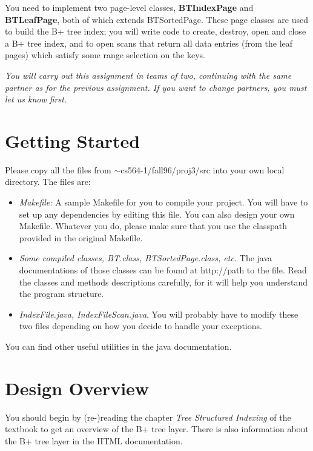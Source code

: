 You need to implement two page-level classes,
{\bf BTIndexPage} and {\bf BTLeafPage}, both of which extends
BTSortedPage.
These page classes are used to build the B+ tree index;
you will write code to create, destroy, open and close a B+ tree index, and
to open scans that return all data entries (from the leaf pages)
which satisfy some range selection on the keys.

{\em  You will carry out this assignment in teams of
two, continuing with the same partner as for the previous assignment.
If you want to change partners, you must let us know first.}

\section{Getting Started}
\label{sec:start}

Please copy all the files from $\sim$cs564-1/fall96/proj3/src
into your own local directory. The files are:

\begin {itemize}
\item
{\em Makefile:}
A sample Makefile for you to compile your project.  
You will have to set up any dependencies by editing this file.
You can also design your own Makefile.  Whatever you do, please
make sure that you use the classpath provided in the original
Makefile.

\item
{\em Some compiled classes, BT.class, BTSortedPage.class, etc. }
The java documentations of those classes can be found at
http://path to the file.  Read the classes and methods descriptions 
carefully, for it will help you understand the program structure.

\item
{\em IndexFile.java, IndexFileScan.java}.
You will probably have to modify these two files depending on
how you decide to handle your exceptions.
\end{itemize}

You can find other useful utilities in the java documentation.

\section{Design Overview}

You should begin by (re-)reading the chapter
{\em Tree Structured Indexing} of the textbook to get an overview of 
the B+ tree layer.  There is also information about the B+ tree layer
in the HTML documentation.

